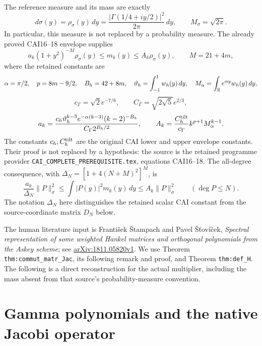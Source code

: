 The reference measure and its mass are exactly
\[
 d\sigma(y)=\rho_\sigma(y)\,dy
 =\frac{|\Gamma(1/4+iy/2)|^2}{2\pi}\,dy,
 \qquad M_\sigma=\sqrt{2\pi}.
\]
In particular, this measure is not replaced by a probability measure.
The already proved CAI16--18 envelope supplies
\begin{equation}\label{ljacobi:eq:envelope}
 a_k(1+y^2)^{-M}\rho_\sigma(y)\leq m_k(y)
                       \leq A_k\rho_\sigma(y),\qquad M=21+4m,
\end{equation}
where the retained constants are
\[
 \alpha=\pi/2,\quad p=8m-9/2,\quad B_h=42+8m,\quad
 \vartheta_h=\int_{-1}^1w_h(y)\,dy,
 \quad M_\alpha=\int_\mathbb R e^{\alpha y}w_h(y)\,dy,
\]
\[
 c_\Gamma=\sqrt2e^{-7/6},\qquad C_\Gamma=\sqrt{2\sqrt5}e^{2/3},
\]
\[
 a_k=\frac{c_h\vartheta_h^{k-3}e^{-\alpha(k-3)}(k-2)^{-B_h}}
              {C_\Gamma2^{B_h/2}},\qquad
 A_k=\frac{C_h^{\rm tilt}}{c_\Gamma}k^{p+1}M_\alpha^{k-1}.
\]
The constants $c_h,C_h^{\rm tilt}$ are the original CAI lower and
upper envelope constants. Their proof is not replaced by a hypothesis:
the source is the retained programme provider
\texttt{CAI\_\allowbreak COMPLETE\_\allowbreak PREREQUISITE.tex},
equations CAI16--18.
The all-degree consequence, with
$\Delta_N=[1+4(N+M)^2]^M$, is
\begin{equation}\label{ljacobi:eq:finite-envelope}
 \frac{a_k}{\Delta_N}\|P\|_\sigma^2
       \leq\int|P(y)|^2m_k(y)\,dy\leq A_k\|P\|_\sigma^2
       \qquad(\deg P\leq N).
\end{equation}
The notation $\Delta_N$ here distinguishes the retained scalar CAI
constant from the source-coordinate matrix $D_N$ below.

The human literature input is Franti\v{s}ek \v{S}tampach and Pavel
\v{S}\v{t}ov\'{i}\v{c}ek, \emph{Spectral representation of some
weighted Hankel matrices and orthogonal polynomials from the Askey
scheme}; see
\href{https://arxiv.org/abs/1811.05820v1}{arXiv:1811.05820v1}.
We use Theorem \texttt{thm:commut\_\allowbreak matr\_\allowbreak Jac},
its following remark and proof,
and Theorem \texttt{thm:def\_H}. The following is a direct reconstruction
for the actual multiplier, including the mass absent from that
source's probability-measure convention.

\section{Gamma polynomials and the native Jacobi operator}


